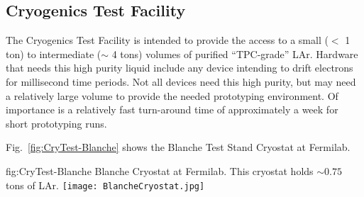 \subsection{Cryogenics Test Facility}
\label{sec:fdgen-slow-cryo-test-facil}
The Cryogenics Test Facility is intended to provide the access to a small ($<$ \num{1} ton) to intermediate ($\sim$ \num{4} tons) volumes of purified ``TPC-grade'' LAr. Hardware that needs this high purity liquid include any device intending to drift electrons for millisecond time periods. Not all devices need this high purity, but may need a relatively large volume to provide the needed prototyping environment. Of importance is a relatively fast turn-around time of approximately a week for short prototyping runs.

Fig.~\ref{fig:CryTest-Blanche} shows the Blanche Test Stand Cryostat at Fermilab.

\begin{dunefigure}{fig:CryTest-Blanche} 
  {Blanche Cryostat at Fermilab. This cryostat holds $\sim 0.75$ tons of LAr.}
  \texttt{[image: BlancheCryostat.jpg]}%
\end{dunefigure}
